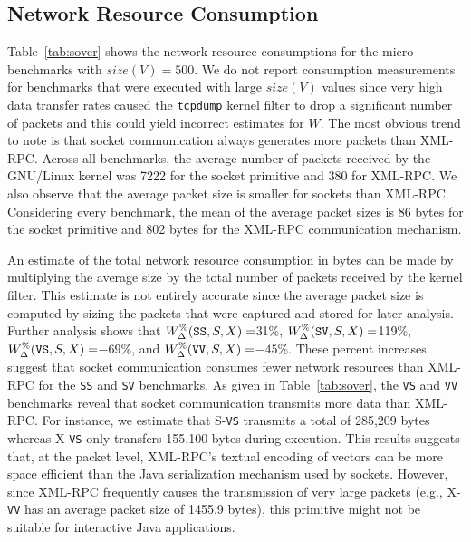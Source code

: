 \documentclass{sig-alternate}
\begin{document}
\subsection{Network Resource Consumption}
\label{sec:space}


Table~\ref{tab:sover} shows the network resource consumptions for the
micro benchmarks with $size(V) = 500$.  We do not report consumption
measurements for benchmarks that were executed with large $size(V)$
values since very high data transfer rates caused the {\tt tcpdump}
kernel filter to drop a significant number of packets and this could
yield incorrect estimates for $W$.  The most obvious trend to note is
that socket communication always generates more packets than XML-RPC.
Across all benchmarks, the average number of packets received by the
GNU/Linux kernel was 7222 for the socket primitive and 380 for
XML-RPC. We also observe that the average packet size is smaller for
sockets than XML-RPC.  Considering every benchmark, the mean of the
average packet sizes is 86 bytes for the socket primitive and 802
bytes for the XML-RPC communication mechanism.


An estimate of the total network resource consumption in bytes can be
made by multiplying the average size by the total number of packets
received by the kernel filter.  This estimate is not entirely accurate
since the average packet size is computed by sizing the packets that
were captured and stored for later analysis.  Further analysis shows
that {\small $W_\Delta^\%(\mbox{{\tt SS}},S,X)=$}31\%, {\small
  $W_\Delta^\%({\tt SV},S,X)=$}119\%, {\small $W_\Delta^\%(\mbox{{\tt
      VS}},S,X)=$}$-69\%$, and {\small $W_\Delta^\%(\mbox{{\tt
      VV}},S,X) =$}$-45\%$.  These percent increases suggest that
socket communication consumes fewer network resources than XML-RPC for
the \texttt{SS} and \texttt{SV} benchmarks.  As given in
Table~\ref{tab:sover}, the \texttt{VS} and \texttt{VV} benchmarks
reveal that socket communication transmits more data than XML-RPC.
For instance, we estimate that S-{\tt VS} transmits a total of 285,209
bytes whereas X-{\tt VS} only transfers 155,100 bytes during
execution.  This results suggests that, at the packet level, XML-RPC's
textual encoding of vectors can be more space efficient than the Java
serialization mechanism used by sockets.  However, since XML-RPC
frequently causes the transmission of very large packets (e.g., X-{\tt
  VV} has an average packet size of 1455.9 bytes), this primitive
might not be suitable for interactive Java applications.
\end{document}
